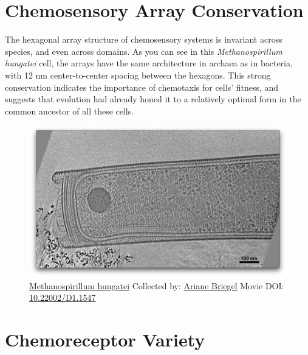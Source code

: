 \documentclass[]{tufte-book}
\begin{document}
\section{Chemosensory Array
Conservation}\label{chemosensory-array-conservation}

The hexagonal array structure of chemosensory systems is invariant
across species, and even across domains. As you can see in this
\emph{Methanospirillum hungatei} cell, the arrays have the same
architecture in archaea as in bacteria, with 12 nm center-to-center
spacing between the hexagons. This strong conservation indicates the
importance of chemotaxis for cells' fitness, and suggests that evolution
had already honed it to a relatively optimal form in the common ancestor
of all these cells.





\begin{figure}
\includegraphics{movie_stills/7_3} \caption[\protect\hyperlink{tree}{Methanospirillum hungatei} Collected
by: \protect\hyperlink{ariane_briegel}{Ariane Briegel} Movie DOI:
\href{https://doi.org/10.22002/D1.1547}{10.22002/D1.1547}]{\protect\hyperlink{tree}{Methanospirillum hungatei} Collected
by: \protect\hyperlink{ariane_briegel}{Ariane Briegel} Movie DOI:
\href{https://doi.org/10.22002/D1.1547}{10.22002/D1.1547}}\label{fig:7-3}
\end{figure}

\section{Chemoreceptor Variety}\label{chemoreceptor-variety}
\end{document}
